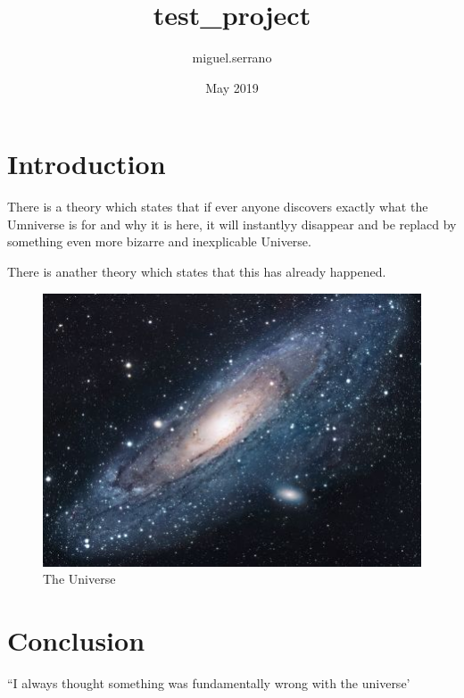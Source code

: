 \documentclass{article}
\title{test_project}
\author{miguel.serrano }
\date{May 2019}
\begin{document}
\maketitle

\section{Introduction}
There is a theory which states that if ever anyone discovers exactly what the Umniverse is for and why it is here, it will instantlyy disappear and be replacd by something even more bizarre and inexplicable Universe.


There is anather theory which states that this has already happened.

\begin{figure}[h!]
\centering
\includegraphics[scale=1.7]{universe}
\caption{The Universe}
\label{fig:universe}
\end{figure}

\section{Conclusion}
``I always thought something was fundamentally wrong with the universe'



\end{document}
